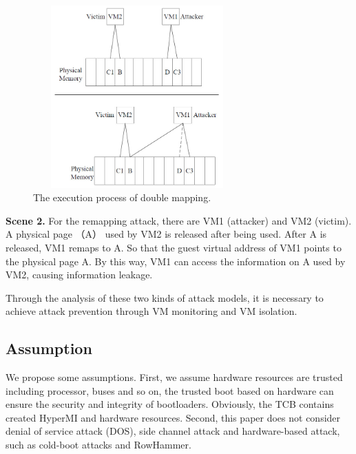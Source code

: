 \documentclass[conference]{IEEEtran}
\begin{document}
\begin{figure}
\centerline{\includegraphics[width=8cm, height=7cm]{VMCS0.jpg}}%
\caption{The execution process of double mapping. } \label{fig0}
\end{figure}

\textbf{Scene 2.}
    For the remapping attack, there are VM1 (attacker) and VM2 (victim). A physical page （A） used by VM2 is released after being used. After A is released, VM1 remaps to A. So that the guest virtual address of VM1 points to the physical page A. By this way, VM1 can access the information on A used by VM2, causing information leakage.

Through the analysis of these two kinds of attack models, it is necessary to achieve attack prevention through VM monitoring and VM isolation.
\subsection{Assumption}

We propose some assumptions.
First, we assume hardware resources are trusted including processor, buses and so on, the trusted boot based on hardware can ensure the security and integrity of bootloaders. Obviously, the TCB contains created HyperMI and hardware resources. Second, this paper does not consider denial of service attack (DOS), side channel attack and hardware-based attack, such as cold-boot attacks and RowHammer.

\end{document}
